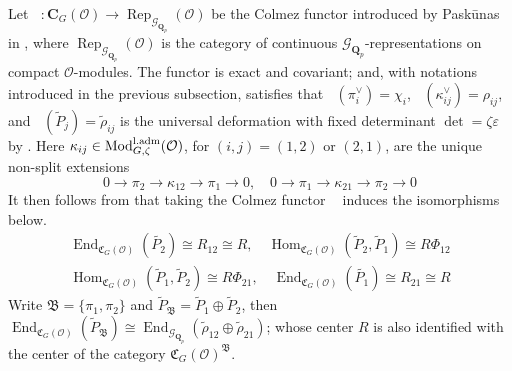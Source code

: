 \documentclass[leqno]{amsart}
\newcommand{\Gp}{\mathcal{G}_{\Qp}} %
\newcommand{\laMod}{\textnormal{Mod}^{\textnormal{l.adm}}}
\DeclareMathOperator{\Rep}{Rep}
\DeclareMathOperator{\V}{\check{\mathbf{V}}} %
\newcommand{\Qp}{\mathbf{Q}_p}
\newcommand{\C}{\mathbf C}
\newcommand{\oo}{\mathcal O}
\newcommand{\1}{\mathbf{1}}
\newcommand{\fC}{\mathfrak C}
\newcommand{\B}{\mathfrak B}
\DeclareMathOperator{\End}{End}
\DeclareMathOperator{\Hom}{Hom}
\theoremstyle{definition}
\theoremstyle{remark}
\begin{document}
Let $\V\colon \C_G(\oo)\to \Rep_{\Gp}(\oo)$
be the Colmez functor introduced by Pask\={u}nas
in \cite[\S 5.7]{pask},
where 
$\Rep_{\Gp}(\oo)$
is the category of continuous $\Gp$-representations
on compact $\oo$-modules.
The functor is exact and covariant;
and, with notations introduced 
in the previous subsection, satisfies that
$\V(\pi_i^\vee)=\chi_i$,
$\V(\kappa_{ij}^\vee)=\rho_{ij}$,
and $\V(\tilde{P}_j)=\tilde{\rho}_{ij}$
is the universal deformation
with fixed determinant $\det=\zeta\varepsilon$
by \cite[Cor 8.7]{pask}.
Here
$\kappa_{ij}\in \laMod_{G,\zeta}(\oo)$,
for $(i,j)=(1,2)$ or  $(2,1)$,
are the unique non-split extensions
\[
	0\to \pi_2\to \kappa_{12}\to \pi_1\to 0,\quad
	0\to \pi_1\to \kappa_{21}\to \pi_2\to 0
\]
It then follows from \cite[Lem 8.10]{pask} that 
taking the Colmez functor 
$\V$ induces the isomorphisms below.
\begin{equation}\label{eq:end_def}
\begin{split}
	\End_{\fC_{G}(\oo)}(\tilde{P_2})\cong R_{12}\cong R,\quad
	\Hom_{\fC_G(\oo)}(\tilde{P}_2, \tilde{P}_1)\cong R\Phi_{12}\\
	\Hom_{\fC_G(\oo)}(\tilde{P}_1, \tilde{P}_2)\cong R\Phi_{21},\quad
	\End_{\fC_{G}(\oo)}(\tilde{P_1})\cong R_{21}\cong R
\end{split}
\end{equation}
Write $\B=\{\pi_1,\pi_2\}$ 
and $ \tilde{P}_\B=\tilde{P}_1\oplus \tilde{P}_2$,
then $\End_{\fC_G(\oo)}(\tilde{P}_\B)\cong 
\End_{\Gp}(\tilde{\rho}_{12}\oplus \tilde{\rho}_{21})$;
whose center $R$ is also identified with 
the center of the category $\fC_G(\oo)^\B$.
\end{document}
